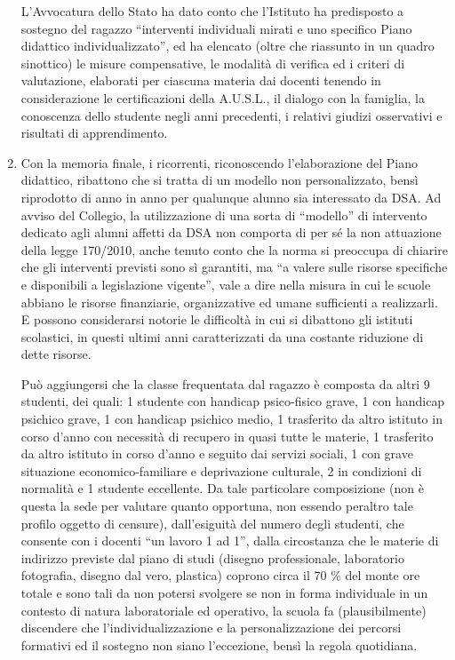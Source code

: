 \begin{enumerate}
	L'Avvocatura dello Stato ha dato conto che l'Istituto ha predisposto a sostegno del ragazzo “interventi individuali mirati e uno specifico Piano didattico individualizzato”, ed ha elencato (oltre che riassunto in un quadro sinottico) le misure compensative, le modalità di verifica ed i criteri di valutazione, elaborati per ciascuna materia dai docenti tenendo in considerazione le certificazioni della A.U.S.L., il dialogo con la famiglia, la conoscenza dello studente negli anni precedenti, i relativi giudizi osservativi e risultati di apprendimento.
	\item Con la memoria finale, i ricorrenti, riconoscendo l'elaborazione del Piano didattico, ribattono che si tratta di un modello non personalizzato, bensì riprodotto di anno in anno per qualunque alunno sia interessato da DSA.
	Ad avviso del Collegio, la utilizzazione di una sorta di “modello” di intervento dedicato agli alunni affetti da DSA non comporta di per sé la non attuazione della legge 170/2010, anche tenuto conto che la norma si preoccupa di chiarire che gli interventi previsti sono sì garantiti, ma “a valere sulle risorse specifiche e disponibili a legislazione vigente”, vale a dire nella misura in cui le scuole abbiano le risorse finanziarie, organizzative ed umane sufficienti a realizzarli. E possono considerarsi notorie le difficoltà in cui si dibattono gli istituti scolastici, in questi ultimi anni caratterizzati da una costante riduzione di dette risorse.
	
	Può aggiungersi che la classe frequentata dal ragazzo è composta da altri 9 studenti, dei quali: 1 studente con handicap psico-fisico grave, 1 con handicap psichico grave, 1 con handicap psichico medio, 1 trasferito da altro istituto in corso d'anno con necessità di recupero in quasi tutte le materie, 1 trasferito da altro istituto in corso d'anno e seguito dai servizi sociali, 1 con grave situazione economico-familiare e deprivazione culturale, 2 in condizioni di normalità e 1 studente eccellente. Da tale particolare composizione (non è questa la sede per valutare quanto opportuna, non essendo peraltro tale profilo oggetto di censure), dall'esiguità del numero degli studenti, che consente con i docenti “un lavoro 1 ad 1”, dalla circostanza che le materie di indirizzo previste dal piano di studi (disegno professionale, laboratorio fotografia, disegno dal vero, plastica) coprono circa il 70 \% del monte ore totale e sono tali da non potersi svolgere se non in forma individuale in un contesto di natura laboratoriale ed operativo, la scuola fa (plausibilmente) discendere che l'individualizzazione e la personalizzazione dei percorsi formativi ed il sostegno non siano l'eccezione, bensì la regola quotidiana.
	

\end{enumerate}
